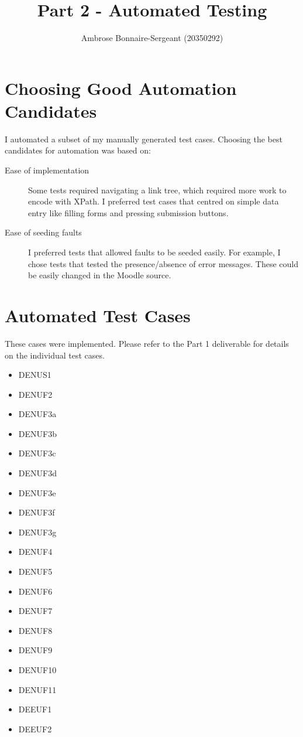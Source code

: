 \documentclass{article}
\title{Part 2 - Automated Testing}
\author{Ambrose Bonnaire-Sergeant (20350292)}
\begin{document}
\maketitle
\tableofcontents

\section{Choosing Good Automation Candidates}

I automated a subset of my manually generated test cases.
Choosing the best candidates for automation was based on:

\begin{description}
  \item [Ease of implementation]
    Some tests required navigating a link tree, which required more work
    to encode with XPath. I preferred test cases that centred on simple
    data entry like filling forms and pressing submission buttons.
  \item [Ease of seeding faults]
    I preferred tests that allowed faults to be seeded easily. For example,
    I chose tests that tested the presence/absence of error messages.
    These could be easily changed in the Moodle source.
\end{description}

\section{Automated Test Cases}

These cases were implemented. Please refer to the Part 1 deliverable for details
on the individual test cases.

\begin{itemize}
\item DENUS1
\item DENUF2
\item DENUF3a
\item DENUF3b
\item DENUF3c
\item DENUF3d
\item DENUF3e
\item DENUF3f
\item DENUF3g
\item DENUF4
\item DENUF5
\item DENUF6
\item DENUF7
\item DENUF8
\item DENUF9
\item DENUF10
\item DENUF11
\item DEEUF1
\item DEEUF2
\end{itemize}
\end{document}
